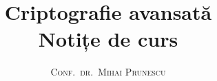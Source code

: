 \documentclass[12pt, a4paper]{book}
\begin{document}
\thispagestyle{empty}
\pagestyle{plain} %

\title{\huge\textbf{Criptografie avansată} \\ \Large{Notițe de curs}}
\vspace{1cm}
\author{\Large\textsc{Conf.\ dr.\ Mihai Prunescu}}

\maketitle

\tableofcontents

\setcounter{page}{1} %





\renewcommand{\indexname}{Index}
\printindex



\nocite{*}
\end{document}
